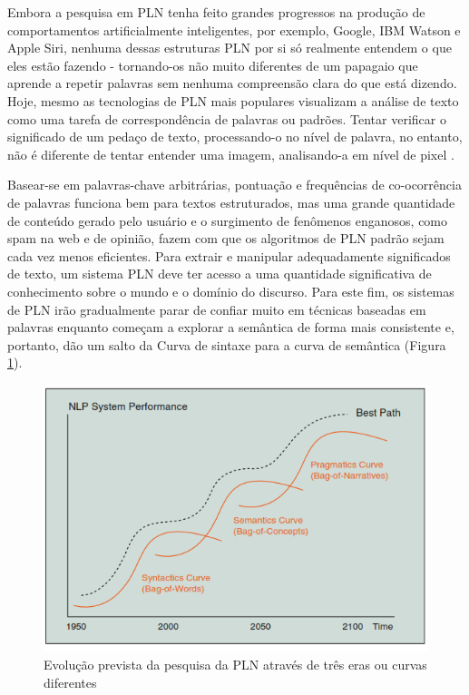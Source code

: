 \documentclass[
	12pt,				%
	openright,			%
	oneside,			%
	a4paper,			%
	english,			%
	spanish,			%
	brazil				%
	]{abntex2}
\begin{document}
Embora a pesquisa em PLN tenha feito grandes progressos na produção de comportamentos artificialmente inteligentes, por exemplo, Google, IBM Watson e Apple Siri, nenhuma dessas estruturas PLN por si só realmente entendem o que eles estão fazendo - tornando-os não muito diferentes de um papagaio que aprende a repetir palavras sem nenhuma compreensão clara do que está dizendo. Hoje, mesmo as tecnologias de PLN mais populares visualizam a análise de texto como uma tarefa de correspondência de palavras ou padrões. Tentar verificar o significado de um pedaço de texto, processando-o no nível de palavra, no entanto, não é diferente de tentar entender uma imagem, analisando-a em nível de pixel \cite{book_Cambria2015}. 

Basear-se em palavras-chave arbitrárias, pontuação e frequências de co-ocorrência de palavras funciona bem para textos estruturados, mas uma grande quantidade de conteúdo gerado pelo usuário e o surgimento de fenômenos enganosos, como spam na web e de opinião, fazem com que os algoritmos de PLN padrão sejam cada vez menos eficientes. Para extrair e manipular adequadamente significados de texto, um sistema PLN deve ter acesso a uma quantidade significativa de conhecimento sobre o mundo e o domínio do discurso.
Para este fim, os sistemas de PLN irão gradualmente parar de confiar muito em técnicas baseadas em palavras enquanto começam a explorar a semântica de forma mais consistente e, portanto, dão um salto da Curva de sintaxe para a curva de semântica (Figura \ref{NLPCurve}).

\begin{figure}[!h]
\centering
\includegraphics{NLPCurve}
\caption{Evolução prevista da pesquisa da PLN através de três eras ou curvas diferentes \cite{book_Cambria2015}}
\label{NLPCurve}
\end{figure}
\end{document}
